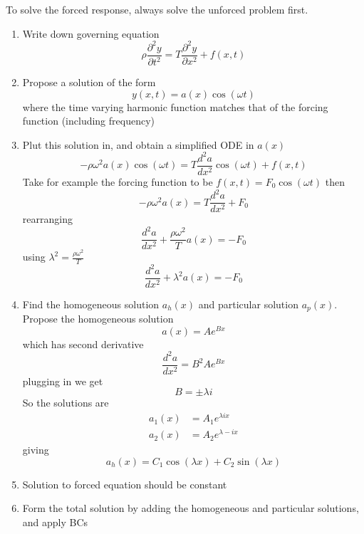 \documentclass[letterpaper,twocolumn,notitlepage]{article}
\begin{document}
  To solve the forced response, always solve the unforced problem first.
  \begin{enumerate}
    \item{Write down governing equation}
    \begin{equation*}
      \boxed{\rho\frac{\partial^{2}y}{\partial t^{2}}=T\frac{\partial^{2}y}{\partial x^{2}}+f(x,t)}
    \end{equation*}
    \item{Propose a solution of the form}
    \begin{equation*}
      y(x,t)=a(x)\cos(\omega t)
    \end{equation*}
    where the time varying harmonic function matches that of the forcing function (including frequency)
    \item{Plut this solution in, and obtain a simplified ODE in $a(x)$}
    \begin{equation*}
      -\rho\omega^{2}a(x)\cos(\omega t)=T\frac{d^{2}a}{dx^{2}}\cos(\omega t)+f(x,t)
    \end{equation*}
    Take for example the forcing function to be $f(x,t)=F_{0}\cos(\omega t)$ then
    \begin{equation*}
      -\rho\omega^{2}a(x)=T\frac{d^{2}a}{dx^{2}}+F_{0}
    \end{equation*}
    rearranging
    \begin{equation*}
      \frac{d^{2}a}{dx^{2}}+\frac{\rho\omega^{2}}{T}a(x)=-F_{0}
    \end{equation*}
    using $\lambda^{2}=\frac{\rho\omega^{2}}{T}$
    \begin{equation*}
      \frac{d^{2}a}{dx^{2}}+\lambda^{2}a(x)=-F_{0}
    \end{equation*}
    \item{%
      Find the homogeneous solution $a_{h}(x)$ and particular solution $a_{p}(x)$.
      Propose the homogeneous solution
    }
    \begin{equation*}
      a(x)=Ae^{Bx}
    \end{equation*}
    which has second derivative
    \begin{equation*}
      \frac{d^{2}a}{dx^{2}}=B^{2}Ae^{Bx}
    \end{equation*}
    plugging in we get
    \begin{equation*}
      B=\pm\lambda i
    \end{equation*}
    So the solutions are
    \begin{equation*}
      \begin{split}
        a_{1}(x)&=A_{1}e^{\lambda ix} \\
        a_{2}(x)&=A_{2}e^{\lambda -ix}
      \end{split}
    \end{equation*}
    giving
    \begin{equation*}
      a_{h}(x)=C_{1}\cos(\lambda x)+C_{2}\sin(\lambda x)
    \end{equation*}
    \item{Solution to forced equation should be constant}
    \item{Form the total solution by adding the homogeneous and particular solutions, and apply BCs}
  \end{enumerate}
\end{document}
